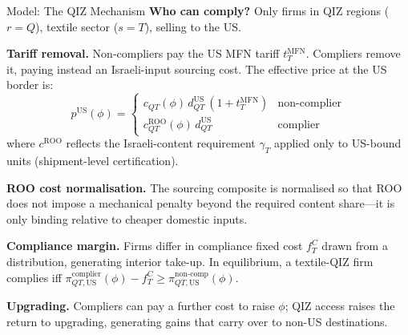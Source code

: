 \documentclass[aspectratio=169,10pt]{beamer}
\begin{document}
\begin{frame}{Model: The QIZ Mechanism}
\small
\textbf{Who can comply?} Only firms in QIZ regions ($r=Q$), textile sector ($s=T$), selling to the US.

\vspace{0.4em}
\textbf{Tariff removal.} Non-compliers pay the US MFN tariff $t^{\text{MFN}}_T$. Compliers remove it, paying instead an Israeli-input sourcing cost. The effective price at the US border is:
\[
p^{\text{US}}(\phi) = \begin{cases}
c_{QT}(\phi)\,d_{QT}^{\text{US}}\,(1+t^{\text{MFN}}_T) & \text{non-complier}\\[4pt]
c^{\text{ROO}}_{QT}(\phi)\,d_{QT}^{\text{US}} & \text{complier}
\end{cases}
\]
where $c^{\text{ROO}}$ reflects the Israeli-content requirement $\gamma_T$ applied only to US-bound units (shipment-level certification).

\vspace{0.4em}
\textbf{ROO cost normalisation.} The sourcing composite is normalised so that ROO does not impose a mechanical penalty beyond the required content share---it is only binding relative to cheaper domestic inputs.

\vspace{0.4em}
\textbf{Compliance margin.} Firms differ in compliance fixed cost $f^C_T$ drawn from a distribution, generating interior take-up. In equilibrium, a textile-QIZ firm complies iff $\pi^{\text{complier}}_{QT,\text{US}}(\phi)-f^C_T \geq \pi^{\text{non-comp}}_{QT,\text{US}}(\phi)$.

\vspace{0.4em}
\textbf{Upgrading.} Compliers can pay a further cost to raise $\phi$; QIZ access raises the return to upgrading, generating gains that carry over to non-US destinations.
\end{frame}
\end{document}

